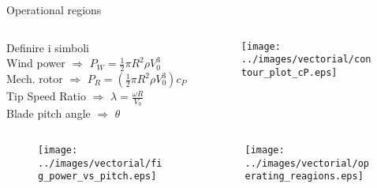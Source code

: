 \begin{frame}{Operational regions}

  \begin{columns}

    \begin{column}{0.5\columnwidth}
      {\small
      Definire i simboli\\
      Wind power $\Rightarrow$ $P_W = \frac{1}{2}\pi R^2 \rho V_0^3$\\
      Mech. rotor $\Rightarrow$ $P_R = \left(\frac{1}{2}\pi R^2 \rho V_0^3\right) c_{P}$
      Tip Speed Ratio $\Rightarrow$ $\lambda=\frac{\omega R}{V_0}$\\
      Blade pitch angle $\Rightarrow$ $\theta$\\
      }
    \end{column}

    \begin{column}{0.5\columnwidth}
      \begin{figure}
        \centering
        \texttt{[image: ../images/vectorial/contour\_plot\_cP.eps]}
      \end{figure}
    \end{column}
    
  \end{columns}

\begin{columns}
  \begin{column}{0.5\columnwidth}
    \begin{figure}
      \centering
      \texttt{[image: ../images/vectorial/fig\_power\_vs\_pitch.eps]}
    \end{figure}
  \end{column}
  \begin{column}{0.5\columnwidth}
    \begin{figure}[H]
      \centering
      \texttt{[image: ../images/vectorial/operating\_reagions.eps]}
    \end{figure}
  \end{column}
\end{columns}


\end{frame}
